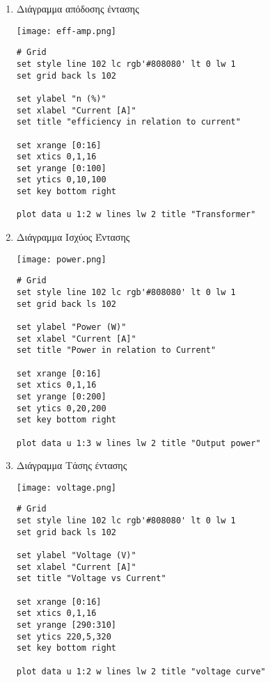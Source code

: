 \documentclass[11pt]{article}
\begin{document}
\begin{enumerate}
\item Διάγραμμα απόδοσης έντασης
\label{sec:org0472f3e}

\begin{center}
\texttt{[image: eff-amp.png]}
\end{center}

\begin{verbatim}
# Grid
set style line 102 lc rgb'#808080' lt 0 lw 1
set grid back ls 102

set ylabel "n (%)"
set xlabel "Current [A]"
set title "efficiency in relation to current"

set xrange [0:16]
set xtics 0,1,16
set yrange [0:100]
set ytics 0,10,100
set key bottom right

plot data u 1:2 w lines lw 2 title "Transformer"
\end{verbatim}



\item Διάγραμμα Ισχύος Έντασης
\label{sec:org18b7590}

\begin{center}
\texttt{[image: power.png]}
\end{center}

\begin{verbatim}
# Grid
set style line 102 lc rgb'#808080' lt 0 lw 1
set grid back ls 102

set ylabel "Power (W)"
set xlabel "Current [A]"
set title "Power in relation to Current"

set xrange [0:16]
set xtics 0,1,16
set yrange [0:200]
set ytics 0,20,200
set key bottom right

plot data u 1:3 w lines lw 2 title "Output power"
\end{verbatim}




\item Διάγραμμα Τάσης έντασης
\label{sec:org4862eb4}

\begin{center}
\texttt{[image: voltage.png]}
\end{center}

\begin{verbatim}
# Grid
set style line 102 lc rgb'#808080' lt 0 lw 1
set grid back ls 102

set ylabel "Voltage (V)"
set xlabel "Current [A]"
set title "Voltage vs Current"

set xrange [0:16]
set xtics 0,1,16
set yrange [290:310]
set ytics 220,5,320
set key bottom right

plot data u 1:2 w lines lw 2 title "voltage curve"
\end{verbatim}

\end{enumerate}
\end{document}
